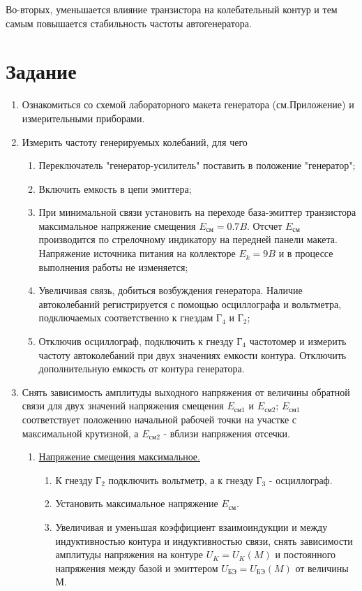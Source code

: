 Во-вторых, уменьшается влияние транзистора на колебательный контур и тем самым повышается стабильность частоты автогенератора.
\section{Задание}
\begin{enumerate}
	\item Ознакомиться со схемой лабораторного макета генератора (см.Приложение) и измерительными приборами.
	\item Измерить частоту генерируемых колебаний, для чего
	\begin{enumerate}
		\item Переключатель "генератор-усилитель" поставить в положение "генератор";
		\item Включить емкость в цепи эмиттера;
		\item При минимальной связи установить на переходе база-эмиттер транзистора максимальное напряжение смещения $E_\text{см} = 0.7 B$. Отсчет $E_\text{см}$ производится по стрелочному индикатору на передней панели макета. Напряжение источника питания на коллекторе $E_k = 9 B$ и в процессе выполнения работы не изменяется;
		\item Увеличивая связь, добиться возбуждения генератора. Наличие автоколебаний регистрируется с помощью осциллографа и вольтметра, подключаемых соответственно к гнездам $\text{Г}_4$ и $\text{Г}_2$;
		\item Отключив осциллограф, подключить к гнезду $\text{Г}_4$ частотомер и измерить частоту автоколебаний при двух значениях емкости контура. Отключить дополнительную емкость от контура генератора.
	\end{enumerate}
	\item Снять зависимость амплитуды выходного напряжения от величины обратной связи для двух значений напряжения смещения $E_\text{см1}$ и $E_\text{см2}$; $E_\text{см1}$ соответствует положению начальной рабочей точки на участке с максимальной крутизной, а $E_\text{см2}$ - вблизи напряжения отсечки.
	\begin{enumerate}
		\item \underline{Напряжение смещения максимальное.}
		\begin{enumerate}
			\item К гнезду $\text{Г}_2$ подключить вольтметр, а к гнезду $\text{Г}_3$ - осциллограф.
			\item Установить максимальное напряжение $E_\text{см}$.
			\item Увеличивая и уменьшая коэффициент взаимоиндукции и между индуктивностью контура и индуктивностью связи, снять зависимости амплитуды напряжения на контуре $U_K=U_K(M)$ и постоянного напряжения между базой и эмиттером $U_\text{БЭ}=U_\text{БЭ}(M)$ от величины М.

\end{enumerate}
\end{enumerate}
\end{enumerate}
